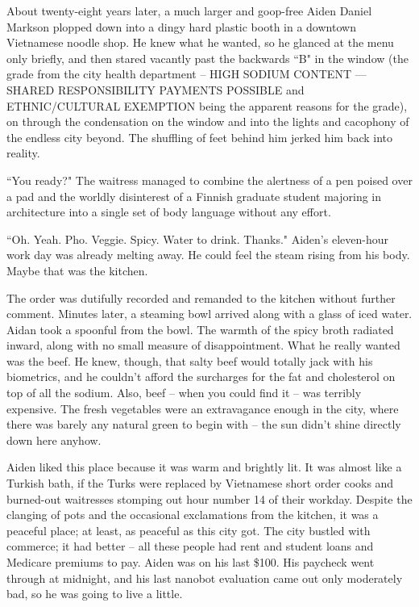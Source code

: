 \documentclass[11pt]{book}
\begin{document}
	About twenty-eight years later, a much larger and goop-free Aiden Daniel Markson plopped down into a dingy hard plastic booth in a downtown Vietnamese noodle shop. He knew what he wanted, so he glanced at the menu only briefly, and then stared vacantly past the backwards  ``B" in the window (the grade from the city health department -- HIGH SODIUM CONTENT --- SHARED RESPONSIBILITY PAYMENTS POSSIBLE and ETHNIC/CULTURAL EXEMPTION being the apparent reasons for the grade), on through the condensation on the window and into the lights and cacophony of the endless city beyond. The shuffling of feet behind him jerked him back into reality.
	
	``You ready?" The waitress managed to combine the alertness of a pen poised over a pad and the worldly disinterest of a Finnish graduate student majoring in architecture into a single set of body language without any effort.
	
	``Oh. Yeah. Pho. Veggie. Spicy. Water to drink. Thanks." Aiden's eleven-hour work day was already melting away. He could feel the steam rising from his body. Maybe that was the kitchen.
	
	The order was dutifully recorded and remanded to the kitchen without further comment. Minutes later, a steaming bowl arrived along with a glass of iced water. Aidan took a spoonful from the bowl. The warmth of the spicy broth radiated inward, along with no small measure of disappointment. What he really wanted was the beef. He knew, though, that salty beef would totally jack with his biometrics, and he couldn't afford the surcharges for the fat and cholesterol on top of all the sodium. Also, beef -- when you could find it -- was terribly expensive. The fresh vegetables were an extravagance enough in the city, where there was barely any natural green to begin with -- the sun didn't shine directly down here anyhow. 
	
	Aiden liked this place because it was warm and brightly lit. It was almost like a Turkish bath, if the Turks were replaced by Vietnamese short order cooks and burned-out waitresses stomping out hour number 14 of their workday. Despite the clanging of pots and the occasional exclamations from the kitchen, it was a peaceful place; at least, as peaceful as this city got. The city bustled with commerce; it had better -- all these people had rent and student loans and Medicare premiums to pay. Aiden was on his last \$100. His paycheck went through at midnight, and his last nanobot evaluation came out only moderately bad, so he was going to live a little.
	
\end{document}
